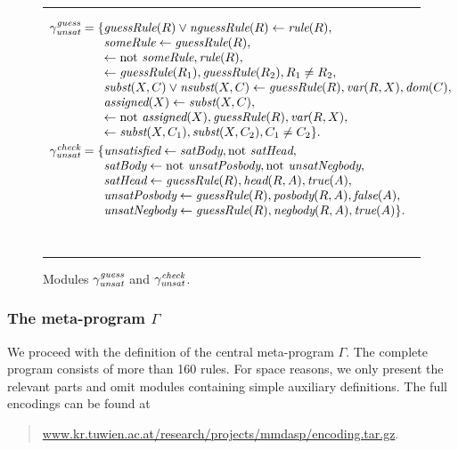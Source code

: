 \documentclass{tlp}
\newcommand{\meta}{\Gamma}
\newcommand{\naf}{\mathrm{not}}
\renewcommand{\mathit}[1]{{\text{\it{#1}}}}
\begin{document}
\begin{figure}[t]
\begin{small}
\hrule
$$\begin{array}{r@{}l}
\UnsatGuess  = \{ & \mathit{guessRule}(R) \vee \mathit{nguessRule}(R) \leftarrow \mathit{rule}(R), 
\\
&
\mathit{someRule} \leftarrow \mathit{guessRule}(R),\\
&
\leftarrow \naf\ \mathit{someRule}, \mathit{rule}(R),
\\
&
\leftarrow \mathit{guessRule}(R_{1}), \mathit{guessRule}(R_{2}), R_{1} \neq R_{2}, \\&\mathit{subst}(X,C) \vee \mathit{nsubst}(X,C) \leftarrow \mathit{guessRule}(R), \mathit{var}(R,X), \mathit{dom}(C), \\
 &\mathit{assigned}(X) \leftarrow \mathit{subst}(X,C),
\\
& 
\leftarrow \naf\ \mathit{assigned}(X), \mathit{guessRule}(R),   \mathit{var}(R,X), \\
&\leftarrow  \mathit{subst}(X,C_{1}),  \mathit{subst}(X,C_{2}), C_{1} \neq C_{2} \}\mbox{.}\\[.3em]
\UnsatCheck  =  \{ &   \mathit{unsatisfied} \leftarrow  \mathit{satBody}, \naf\ \mathit{satHead},
\\
&
\mathit{satBody} \leftarrow  \naf\ \mathit{unsatPosbody}, \naf\ \mathit{unsatNegbody},\\
&\mathit{satHead}      \leftarrow \mathit{guessRule}(R), \mathit{head}(R,A), \mathit{true}(A),\\
&\mathit{unsatPosbody} \leftarrow \mathit{guessRule}(R),\mathit{posbody}(R,A), 
             \mathit{false}(A),\\
&\begin{array}{@{}r}
\mathit{unsatNegbody} \leftarrow \mathit{guessRule}(R),\mathit{negbody}(R,A), 
                          \mathit{true}(A) \}\mbox{.}
\end{array}
\end{array}$$\\
\hrule
\end{small}
\caption{Modules $\UnsatGuess$ and  $\UnsatCheck$\label{fig:UNSAT}.}
\end{figure}



\subsubsection{The meta-program $\meta$}

We proceed with the definition of the central meta-program $\Gamma$. The complete program 
consists of more than 160 rules. For space reasons, we only present the relevant parts and omit 
modules containing simple auxiliary definitions.
The full encodings can be found at 
\begin{quote}
\url{www.kr.tuwien.ac.at/research/projects/mmdasp/encoding.tar.gz}.
\end{quote}
\end{document}
